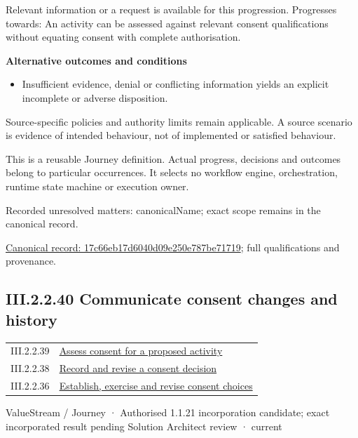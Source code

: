 Relevant information or a request is available for this progression. Progresses towards: An activity can be assessed against relevant consent qualifications without equating consent with complete authorisation.



\par\medskip\textbf{Alternative outcomes and conditions}\par


\begin{itemize}


\item Insufficient evidence, denial or conflicting information yields an explicit incomplete or adverse disposition.

\end{itemize}


Source-specific policies and authority limits remain applicable. A source scenario is evidence of intended behaviour, not of implemented or satisfied behaviour.



This is a reusable Journey definition. Actual progress, decisions and outcomes belong to particular occurrences. It selects no workflow engine, orchestration, runtime state machine or execution owner.


{\small Recorded unresolved matters: canonicalName; exact scope remains in the canonical record.}\par
{\footnotesize \href{../../../../../../../continuum/strategy/value-stream/17c66eb17d6040d09e250e787be71719.md}{Canonical record: 17c66eb17d6040d09e250e787be71719}; full qualifications and provenance.}\par
\subsection*{III.2.2.40 Communicate consent changes and history}
\label{navigation:III.2.2.40}

\begin{longtable}{p{.22\linewidth}p{.73\linewidth}}
III.2.2.39 & \hyperref[element:17c66eb17d6040d09e250e787be71719]{Assess consent for a proposed activity} \\
III.2.2.38 & \hyperref[element:74779c85619741d18053a2304457190b]{Record and revise a consent decision} \\
III.2.2.36 & \hyperref[element:850bba32295c4e53b20036b80f77f491]{Establish, exercise and revise consent choices} \\
\end{longtable}
\label{element:9356b876f2aa427f989ad4f1b7f2fa4c}
{\small ValueStream / Journey · Authorised 1.1.21 incorporation candidate; exact incorporated result pending Solution Architect review · current}\par

